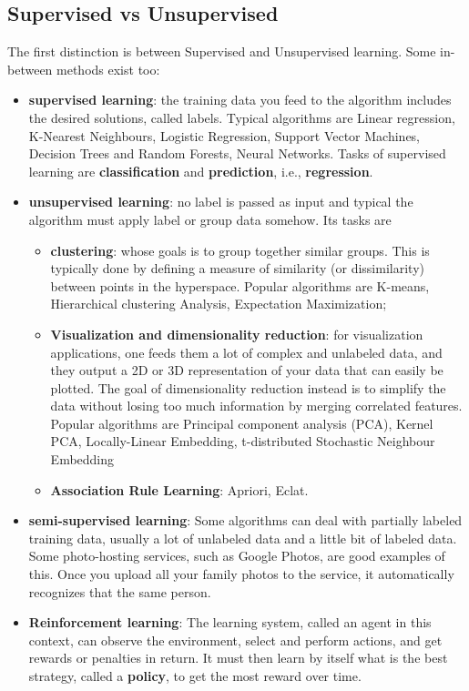 \documentclass[12pt, letterpaper]{article}
\theoremstyle{definition}
\begin{document}
\subsection{Supervised vs Unsupervised}
The first distinction is between Supervised and Unsupervised learning. Some in-between methods exist too:
\begin{itemize}
\item \textbf{supervised learning}: the training data you feed to the algorithm includes the desired solutions, called labels. Typical algorithms are Linear regression, K-Nearest Neighbours, Logistic Regression,  Support Vector Machines, Decision Trees and Random Forests, Neural Networks. Tasks of supervised learning are \textbf{classification} and \textbf{prediction}, i.e., \textbf{regression}.
\item \textbf{unsupervised learning}: no label is passed as input and typical the algorithm must apply label or group data somehow. Its tasks are 
\begin{itemize}
\item \textbf{clustering}: whose goals is to group together similar groups. This is typically done by defining a measure of similarity (or dissimilarity) between points in the hyperspace. Popular algorithms are K-means, Hierarchical clustering Analysis, Expectation Maximization; 
\item \textbf{Visualization and dimensionality reduction}: for visualization applications, one feeds them a lot of complex and unlabeled data, and they output a 2D or 3D representation of your data that can easily be plotted. The goal of dimensionality reduction instead is to simplify the data without losing too much information by merging correlated features. Popular algorithms are Principal component analysis (PCA), Kernel PCA, Locally-Linear Embedding, t-distributed Stochastic Neighbour Embedding
\item \textbf{Association Rule Learning}: Apriori, Eclat.
\end{itemize}
\item \textbf{semi-supervised learning}: Some algorithms can deal with partially labeled training data, usually a lot of unlabeled data and a little bit of labeled data. Some photo-hosting services, such as Google Photos, are good examples of this. Once you upload all your family photos to the service, it automatically recognizes that the same person.
\item \textbf{Reinforcement learning}: The learning system, called an agent in this context, can observe the environment, select and perform actions, and get rewards or penalties in return. It must then learn by itself what is the best strategy, called a \textbf{policy}, to get the most reward over time.
\end{itemize}
\end{document}
